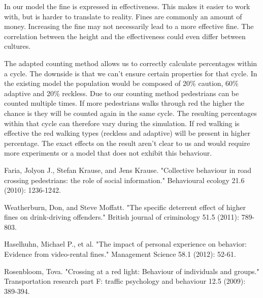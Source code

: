 \documentclass[a4paper]{article}
\begin{document}
In our model the fine is expressed in effectiveness. This makes it easier to work with, but is harder to translate to reality. Fines are commonly an amount of money. Increasing the fine may not necessarily lead to a more effective fine. The correlation between the height and the effectiveness could even differ between cultures.

The adapted counting method allows us to correctly calculate percentages within a cycle. The downside is that we can't ensure certain properties for that cycle. In the existing model the population would be composed of 20\% caution, 60\% adaptive and 20\% reckless. Due to our counting method pedestrians can be counted multiple times. If more pedestrians walks through red the higher the chance is they will be counted again in the same cycle. The resulting percentages within that cycle can therefore vary during the simulation. If red walking is effective the red walking types (reckless and adaptive) will be present in higher percentage. The exact effects on the result aren't clear to us and would require more experiments or a model that does not exhibit this behaviour.

\clearpage

\begin{thebibliography}{3}

	 Faria, Jolyon J., Stefan Krause, and Jens Krause. "Collective behaviour in road crossing pedestrians: the role of social information." Behavioural ecology 21.6 (2010): 1236-1242.

	 Weatherburn, Don, and Steve Moffatt. "The specific deterrent effect of higher fines on drink-driving offenders." British journal of criminology 51.5 (2011): 789-803.
    
	 Haselhuhn, Michael P., et al. "The impact of personal experience on behavior: Evidence from video-rental fines." Management Science 58.1 (2012): 52-61.
    
	 Rosenbloom, Tova. "Crossing at a red light: Behaviour of individuals and groups." Transportation research part F: traffic psychology and behaviour 12.5 (2009): 389-394.
	
\end{thebibliography}
\end{document}
